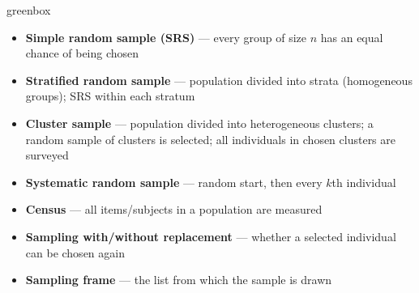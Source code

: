\documentclass[10pt]{article}
\begin{document}
\begin{skillbox}{greenbox}
\begin{minipage}[t]{0.48\linewidth}
    \begin{itemize}
        \item \textbf{Simple random sample (SRS)} --- every group of size $n$ has an
              equal chance of being chosen
        \item \textbf{Stratified random sample} --- population divided into strata
              (homogeneous groups); SRS within each stratum
        \item \textbf{Cluster sample} --- population divided into heterogeneous clusters;
              a random sample of clusters is selected; all individuals in chosen
              clusters are surveyed
    \end{itemize}
\end{minipage}
\hfill
\begin{minipage}[t]{0.48\linewidth}
    \begin{itemize}
        \item \textbf{Systematic random sample} --- random start, then every $k$th
              individual
        \item \textbf{Census} --- all items/subjects in a population are measured
        \item \textbf{Sampling with/without replacement} --- whether a selected
              individual can be chosen again
        \item \textbf{Sampling frame} --- the list from which the sample is drawn
    \end{itemize}
\end{minipage}
\end{skillbox}
\end{document}
